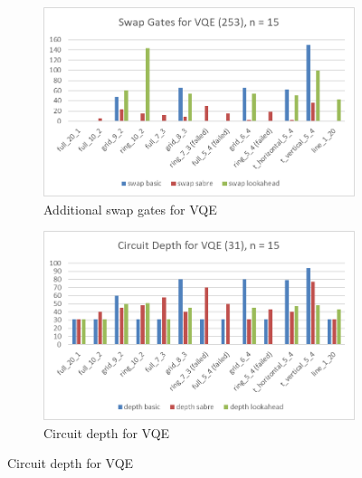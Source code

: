 \begin{figure}[htb]
    \centering
    \begin{subfigure}{0.48\linewidth}
        \includegraphics[width=\linewidth]{image/chart_vqe.png}
        \caption{Additional swap gates for VQE}
        \label{fig:chart-vqe}
    \end{subfigure}
    \begin{subfigure}{0.48\linewidth}
        \includegraphics[width=\linewidth]{image/chart_vqe_depth.png}
        \caption{Circuit depth for VQE}
        \label{fig:chart-vqe-depth}
    \end{subfigure}
\end{figure}

